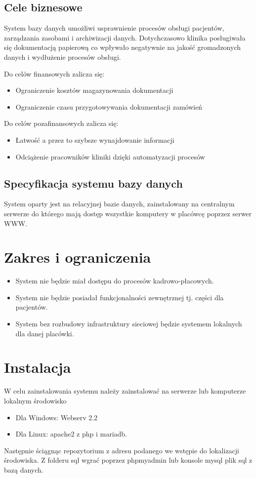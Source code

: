 \documentclass[10pt,a4paper]{article}
\begin{document}
	\subsection{Cele biznesowe}
	System bazy danych umożliwi usprawnienie procesów obsługi pacjentów, zarządzania zasobami i archiwizacji danych. Dotychczasowo klinika posługiwała się dokumentacją papierową co wpływało negatywnie na jakość gromadzonych danych i wydłużenie procesów obsługi.
	
	Do celów finansowych zalicza się:
	\begin{itemize}
		\item Ograniczenie kosztów magazynowania dokumentacji
		\item Ograniczenie czasu przygotowywania dokumentacji zamówień 
		
	\end{itemize}
	Do celów pozafinansowych zalicza się:
	\begin{itemize}
		\item Łatwość a przez to szybsze wynajdowanie informacji
		\item Odciążenie pracowników kliniki dzięki automatyzacji procesów
	\end{itemize}

	\subsection{Specyfikacja systemu bazy danych}
	System oparty jest na relacyjnej bazie danych, zainstalowany na centralnym serwerze do którego mają dostęp wszystkie komputery w placówcę poprzez serwer WWW.
	
	\section{Zakres i ograniczenia}
	\begin{itemize}
		\item System nie będzie miał dostępu do procesów kadrowo-płacowych. 
		\item System nie będzie posiadał funkcjonalności zewnętrznej tj. części dla pacjentów.
		\item System bez rozbudowy infrastruktury sieciowej będzie systemem lokalnych dla danej placówki.
	\end{itemize}
	


	\section {Instalacja}
		W celu zainstalowania systemu należy zainstalować na serwerze lub komputerze lokalnym środowisko
		\begin{itemize}
			\item Dla Windows: Webserv 2.2
			\item Dla Linux: apache2 z php i mariadb.
		\end{itemize}
	Następnie ściągnąc repozytorium z adresu podanego we wstępie do lokalizacji środowiska. Z folderu sql wgrać poprzez phpmyadmin lub konsole mysql plik sql z bazą danych. 
	
\end{document}
